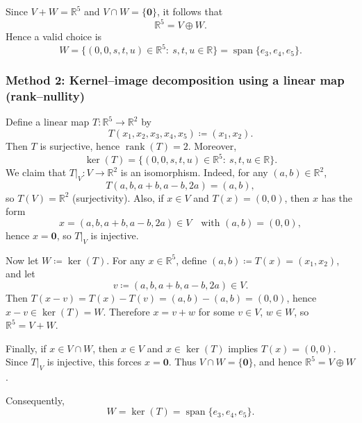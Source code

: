 \documentclass[12pt]{article}
\begin{document}
Since \(V+W=\mathbb{R}^5\) and \(V\cap W=\{\mathbf{0}\}\), it follows that
\[
\mathbb{R}^5 = V \oplus W.
\]
Hence a valid choice is
\[
\boxed{\,W=\{(0,0,s,t,u)\in\mathbb{R}^5:\ s,t,u\in\mathbb{R}\}=\operatorname{span}\{e_3,e_4,e_5\}.\,}
\]

\subsubsection{Method 2: Kernel--image decomposition using a linear map (rank--nullity)}
Define a linear map \(T:\mathbb{R}^5\to\mathbb{R}^2\) by
\[
T(x_1,x_2,x_3,x_4,x_5)\coloneqq (x_1,x_2).
\]
Then \(T\) is surjective, hence \(\operatorname{rank}(T)=2\). Moreover,
\[
\ker(T)=\{(0,0,s,t,u)\in\mathbb{R}^5:\ s,t,u\in\mathbb{R}\}.
\]
We claim that \(T|_V:V\to\mathbb{R}^2\) is an isomorphism. Indeed, for any \((a,b)\in\mathbb{R}^2\),
\[
T(a,b,a+b,a-b,2a)=(a,b),
\]
so \(T(V)=\mathbb{R}^2\) (surjectivity). Also, if \(x\in V\) and \(T(x)=(0,0)\), then \(x\) has the form
\[
x=(a,b,a+b,a-b,2a)\in V\quad\text{with }(a,b)=(0,0),
\]
hence \(x=\mathbf{0}\), so \(T|_V\) is injective.

Now let \(W\coloneqq \ker(T)\). For any \(x\in\mathbb{R}^5\), define \((a,b)\coloneqq T(x)=(x_1,x_2)\), and let
\[
v\coloneqq (a,b,a+b,a-b,2a)\in V.
\]
Then \(T(x-v)=T(x)-T(v)=(a,b)-(a,b)=(0,0)\), hence \(x-v\in \ker(T)=W\). Therefore \(x=v+w\) for some \(v\in V\), \(w\in W\), so \(\mathbb{R}^5=V+W\).

Finally, if \(x\in V\cap W\), then \(x\in V\) and \(x\in \ker(T)\) implies \(T(x)=(0,0)\). Since \(T|_V\) is injective, this forces \(x=\mathbf{0}\). Thus \(V\cap W=\{\mathbf{0}\}\), and hence \(\mathbb{R}^5=V\oplus W\).

Consequently,
\[
\boxed{\,W=\ker(T)=\operatorname{span}\{e_3,e_4,e_5\}.\,}
\]
\end{document}
